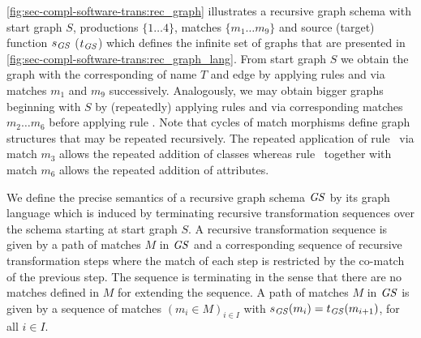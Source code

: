 \begin{example}
\label{ex:sec-compl-software-trans:rec_schema}
\cref{fig:sec-compl-software-trans:rec_graph} illustrates a recursive graph schema with start graph $S$, productions $\{1 \ldots 4\}$, matches $\{m_1 \ldots m_9\}$ and source (target) function $s_\mathit{GS}$ ($t_\mathit{GS}$) which defines the infinite set of graphs that are presented in \cref{fig:sec-compl-software-trans:rec_graph_lang}.
From start graph $S$ we obtain the graph with the corresponding  of name $T$ and edge  by applying rules  and  via matches $m_1$ and $m_9$ successively.
Analogously, we may obtain bigger graphs beginning with $S$ by (repeatedly) applying rules  and  via corresponding matches $m_2 \ldots m_6$ before applying rule .
Note that cycles of match morphisms define graph structures that may be repeated recursively.
The repeated application of rule~ via match $m_3$ allows the repeated addition of classes whereas rule~ together with match $m_6$ allows the repeated addition of attributes.
\envEndMarker
\end{example}

We define the precise semantics of a recursive graph schema $\mathit{GS}$ by its graph language which is induced by terminating recursive transformation sequences over the schema starting at start graph $S$.
A recursive transformation sequence is given by a path of matches $M$ in $\mathit{GS}$ and a corresponding sequence of recursive transformation steps where the match of each step is restricted by the co-match of the previous step.
The sequence is terminating in the sense that there are no matches defined in $M$ for extending the sequence.
A path of matches $M$ in $\mathit{GS}$ is given by a sequence of matches $(m_i \in M)_{i \in I}$ with $s_\mathit{GS}(m_i)=t_\mathit{GS}(m_{i+1})$, for all $i \in I$.

